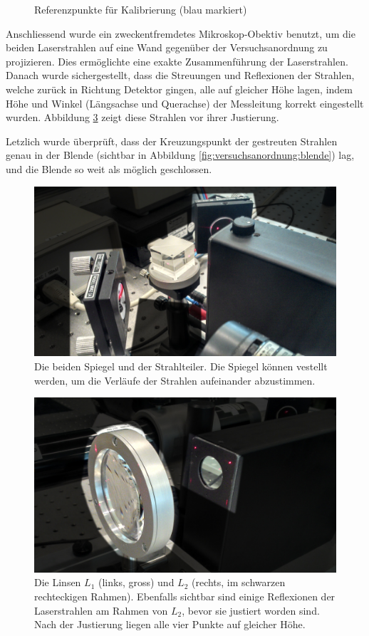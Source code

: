 \begin{figure}[h!t]
    \centering
    \resizebox{.40\textwidth}{!}{}
    \caption{%
        Referenzpunkte f\"ur Kalibrierung (blau markiert)
    }
    \label{fig:justierung}
\end{figure}

Anschliessend  wurde  ein   zweckentfremdetes  Mikroskop-Obektiv  benutzt,  um
die  beiden  Laserstrahlen auf  eine  Wand  gegen\"uber der  Versuchsanordnung
zu   projizieren. Dies  erm\"oglichte   eine   exakte  Zusammenf\"uhrung   der
Laserstrahlen. Danach   wurde   sichergestellt,   dass  die   Streuungen   und
Reflexionen  der  Strahlen,  welche  zur\"uck  in  Richtung  Detektor  gingen,
alle  auf  gleicher  H\"ohe  lagen,  indem  H\"ohe  und  Winkel  (L\"angsachse
und   Querachse)  der   Messleitung   korrekt  eingestellt   wurden. Abbildung
\ref{fig:lensL1} zeigt diese Strahlen vor ihrer Justierung.

Letzlich wurde \"uberpr\"uft, dass  der Kreuzungspunkt der gestreuten Strahlen
genau in der Blende (sichtbar in Abbildung \ref{fig:versuchsanordnung:blende})
lag, und die Blende so weit als m\"oglich geschlossen.

\begin{figure}[h!t]
    \centering
    \includegraphics[width=.50\textwidth]{images/spiegel.jpeg}
    \caption{%
        Die beiden Spiegel und der Strahlteiler. Die Spiegel k\"onnen vestellt
        werden, um die Verl\"aufe der Strahlen aufeinander abzustimmen.
    }
    \label{fig:spiegel}
\end{figure}


\begin{figure}[h!t]
    \centering
    \includegraphics[width=.6\textwidth]{images/linse.jpeg}
    \caption{%
        Die  Linsen  $L_1$ (links,  gross)  und  $L_2$ (rechts,  im  schwarzen
        rechteckigen  Rahmen). Ebenfalls  sichtbar   sind  einige  Reflexionen
        der  Laserstrahlen am  Rahmen  von $L_2$,  bevor  sie justiert  worden
        sind. Nach der Justierung liegen alle vier Punkte auf gleicher H\"ohe.
    }
    \label{fig:lensL1}
\end{figure}

